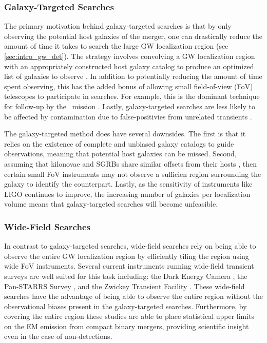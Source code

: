 \subsubsection{Galaxy-Targeted Searches}
\label{sec:intro_galaxy}
The primary motivation behind galaxy-targeted searches is that by only observing the potential host galaxies of the merger, one can drastically reduce the amount of time it takes to search the large GW localization region (see \cref{sec:intro_gw_det}). The strategy involves convolving a GW localization region with an appropriately constructed host galaxy catalog \citep[e.g., the Gravitational Wave Galaxy Catalog, GWGV;][]{GWGCRef} to produce an optimized list of galaxies to observe \citep{Gehrels+16,Singer+16a,Singer+16b}. In addition to potentially reducing the amount of time spent observing, this has the added bonus of allowing small field-of-view (FoV) telescopes to participate in searches. For example, this is the dominant technique for follow-up by the \swift\ mission \citep{Gehrels+04,Kanner+12}. Lastly, galaxy-targeted searches are less likely to be affected by contamination due to false-positivies from unrelated transients \citep{Singer+16a}.

The galaxy-targeted method does have several downsides. The first is that it relies on the existence of complete and unbiased galaxy catalogs to guide observations, meaning that potential host galaxies can be missed. Second, assuming that kilonovae and SGRBs share similar offsets from their hosts \citep[see e.g.,][]{FongBerger13}, then certain small FoV instruments may not observe a sufficien region surrounding the galaxy to identify the counterpart. Lastly, as the sensitivity of instruments like LIGO continues to improve, the increasing number of galaxies per localization volume means that galaxy-targeted searches will become unfeasible.

\subsubsection{Wide-Field Searches}
\label{sec:intro_widefield}
In contrast to galaxy-targeted searches, wide-field searches rely on being able to observe the entire GW localization region by efficiently tiling the region using wide FoV instruments. Several current instruments running wide-field transient surveys are well suited for this task including: the Dark Energy Camera \citep[DECam;][]{Flaugher+15}, the Pan-STARRS Survey \citep{Chambers+16}, and the Zwickey Transient Facility \citep[ZTF;][]{ZTFRef1,ZTFRef2}. These wide-field searches have the advantage of being able to observe the entire region without the observational biases present in the galaxy-targeted searches. Furthermore, by covering the entire region these studies are able to place statistical upper limits on the EM emission from compact binary mergers, providing scientific insight even in the case of non-detections.

